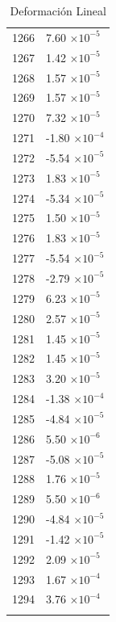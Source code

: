 \documentclass[a4paper,11pt]{article}
\begin{document}
\begin{center}
\begin{longtable}{|R{1.5cm}|R{2.5cm}|}
 1266 &         7.60 $\times 10^{          -5}$ \\
 1267 &         1.42 $\times 10^{          -5}$ \\
 1268 &         1.57 $\times 10^{          -5}$ \\
 1269 &         1.57 $\times 10^{          -5}$ \\
 1270 &         7.32 $\times 10^{          -5}$ \\
 1271 &        -1.80 $\times 10^{          -4}$ \\
 1272 &        -5.54 $\times 10^{          -5}$ \\
 1273 &         1.83 $\times 10^{          -5}$ \\
 1274 &        -5.34 $\times 10^{          -5}$ \\
 1275 &         1.50 $\times 10^{          -5}$ \\
 1276 &         1.83 $\times 10^{          -5}$ \\
 1277 &        -5.54 $\times 10^{          -5}$ \\
 1278 &        -2.79 $\times 10^{          -5}$ \\
 1279 &         6.23 $\times 10^{          -5}$ \\
 1280 &         2.57 $\times 10^{          -5}$ \\
 1281 &         1.45 $\times 10^{          -5}$ \\
 1282 &         1.45 $\times 10^{          -5}$ \\
 1283 &         3.20 $\times 10^{          -5}$ \\
 1284 &        -1.38 $\times 10^{          -4}$ \\
 1285 &        -4.84 $\times 10^{          -5}$ \\
 1286 &         5.50 $\times 10^{          -6}$ \\
 1287 &        -5.08 $\times 10^{          -5}$ \\
 1288 &         1.76 $\times 10^{          -5}$ \\
 1289 &         5.50 $\times 10^{          -6}$ \\
 1290 &        -4.84 $\times 10^{          -5}$ \\
 1291 &        -1.42 $\times 10^{          -5}$ \\
 1292 &         2.09 $\times 10^{          -5}$ \\
 1293 &         1.67 $\times 10^{          -4}$ \\
 1294 &         3.76 $\times 10^{          -4}$ \\
\bottomrule[0.8mm]                               
\caption{Deformación Lineal}             
\end{longtable}                                  
\end{center}                                     

\newpage  
\listoftables  
\end{document}
